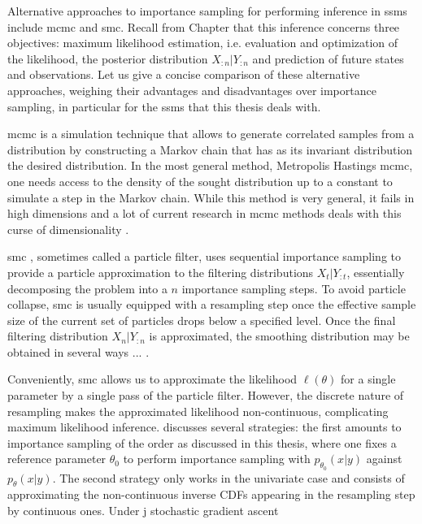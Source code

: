 Alternative approaches to importance sampling for performing inference in \glspl{ssm} include \gls{mcmc} and \gls{smc}. 
Recall from Chapter  that this inference concerns three objectives: maximum likelihood estimation, i.e. evaluation and optimization of the likelihood, the posterior distribution $X_{:n} | Y_{:n}$ and prediction of future states and observations. Let us give a concise comparison of these alternative approaches, weighing their advantages and disadvantages over importance sampling, in particular for the \glspl{ssm} that this thesis deals with. 

\gls{mcmc} is a simulation technique that allows to generate correlated samples from a distribution by constructing a Markov chain that has as its invariant distribution the desired distribution. In the most general method, Metropolis Hastings \gls{mcmc}, one needs access to the density of the sought distribution up to a constant to simulate a step in the Markov chain. While this method is very general, it fails in high dimensions and a lot of current research in \gls{mcmc} methods deals with this  curse of dimensionality . 


\gls{smc} \cite{Chopin2020Introduction}, sometimes called a particle filter, uses sequential importance sampling to provide a particle approximation to the filtering distributions $X_{t} | Y_{:t}$, essentially decomposing the problem into a $n$ importance sampling steps. 
To avoid particle collapse, \gls{smc} is usually equipped with a resampling step once the effective sample size of the current set of particles drops below a specified level. Once the final filtering distribution $X_{n}|Y_{:n}$ is approximated, the smoothing distribution may be obtained in several ways ... .

Conveniently, \gls{smc} allows us to approximate the likelihood $\ell(\theta)$ for a single parameter by a single pass of the particle filter. However, the discrete nature of resampling makes the approximated likelihood non-continuous, complicating maximum likelihood inference. \cite[Chapter 14.3]{Chopin2020Introduction} discusses several strategies: the first amounts to importance sampling of the order as discussed in this thesis, where one fixes a reference parameter $\theta_{0}$ to perform importance sampling with $p_{\theta_{0}}(x|y)$ against $p_{\theta}(x|y)$. The second strategy only works in the univariate case and consists of approximating the non-continuous inverse CDFs appearing in the resampling step by continuous ones. Under j stochastic gradient ascent  

